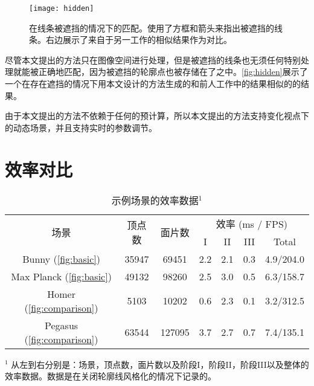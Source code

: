 \begin{figure}[tbh]
    \centering
    \texttt{[image: hidden]}
    \caption{\label{fig:hidden}
    在线条被遮挡的情况下的匹配。使用了方框和箭头来指出被遮挡的线条。右边展示了来自于另一工作\cite{bukenberger2018stereo}的相似结果作为对比。}
\end{figure}

尽管本文提出的方法只在图像空间进行处理，但是被遮挡的线条也无须任何特别处理就能被正确地匹配，因为被遮挡的轮廓点也被存储在了\ppll{}之中。\autoref{fig:hidden}展示了一个在存在遮挡的情况下用本文设计的方法生成的和前人工作中的结果相似的的结果。

由于本文提出的方法不依赖于任何的预计算，所以本文提出的方法支持变化视点下的动态场景，并且支持实时的参数调节。

\section{效率对比}

\begin{table}[tbh]
    \renewcommand{\arraystretch}{1.3}
    \centering
  \begin{threeparttable}
    \caption{示例场景的效率数据$^1$}
    \label{tab:performance}
    \centering
    \begin{tabular}{c|cc|ccc|c}
    \hline
    \multirow{2}{*}{场景} & \multirow{2}{*}{顶点数} & \multirow{2}{*}{面片数} & \multicolumn{4}{c}{效率 (ms / FPS)} \\
    \cline{4-7}
    & & & I & II & III & Total \\
    \hline
    Bunny (\autoref{fig:basic}) & 35947 & 69451 & {2.2} & {2.1} & {0.3} & {4.9/204.0} \\
    Max Planck (\autoref{fig:basic}) & 49132 & 98260 & {2.5} & {3.0} & {0.5} & {6.3/158.7} \\
    Homer (\autoref{fig:comparison}) & 5103 & 10202 & {0.6} & {2.3} & {0.1} & {3.2/312.5} \\
    Pegasus (\autoref{fig:comparison}) & 63544 & 127095 & {3.7} & {2.7} & {0.7} & {7.4/135.1} \\
    \hline
    \end{tabular}
    \begin{tablenotes}
      \item $^1$ 从左到右分别是：场景，顶点数，面片数以及阶段I，阶段II，阶段III以及整体的效率数据。数据是在关闭轮廓线风格化的情况下记录的。
    \end{tablenotes}
  \end{threeparttable}
\end{table}


